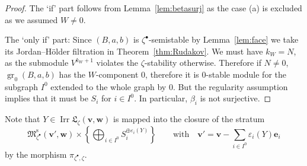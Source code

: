 \documentclass[10pt,a4paper]{amsart}
\theoremstyle{definition}
\numberwithin{equation}{section}
\newcommand{\thmref}[1]{Theorem~\ref{#1}}
\newcommand{\lemref}[1]{Lemma~\ref{#1}}
\newcommand{\M}{{\mathfrak M}} %
\newcommand{\Mreg}{\M^{\operatorname{s}}}
\newcommand{\La}{{\mathfrak L}} %
\newcommand{\bv}{{\mathbf v}} %
\newcommand{\bw}{{\mathbf w}} %
\newcommand{\be}{{\mathbf e}}
\newcommand{\gr}{\operatorname{gr}} %
\newcommand{\Irr}{\operatorname{Irr}}
\begin{document}
\begin{proof}
The `if' part follows from \lemref{lem:betasurj} as the case (a) is
excluded as we assumed $W\neq 0$.

The `only if' part: Since $(B,a,b)$ is $\zeta^\bullet$-semistable by
\lemref{lem:face} we take its Jordan--H\"older f\/iltration in
\thmref{thm:Rudakov}. We must have $k_W = N$, as the submodule
$V^{k_W+1}$ violates the $\zeta$-stability otherwise. Therefore if $N
\neq 0$, $\gr_0(B,a,b)$ has the $W$-component $0$, therefore it is
$0$-stable module for the subgraph $I^0$ extended to the whole graph
by $0$. But the regularity assumption implies that it must be $S_i$
for $i\in I^0$. In particular, $\beta_i$ is not surjective.
\end{proof}

Note that $Y\in\Irr\La_\zeta(\bv,\bw)$ is mapped into the closure of
the stratum
\begin{equation*}
   \Mreg_{\zeta^\bullet}(\bv',\bw) \times \left\{ \bigoplus_{i\in I^0}
   S_i^{\oplus \varepsilon_i(Y)} \right\} \qquad\text{with}\quad
   \bv' = \bv - \sum_{i\in I^0} \varepsilon_i(Y) \be_i
\end{equation*}
by the morphism $\pi_{\zeta^\bullet,\zeta}$.
\end{document}

